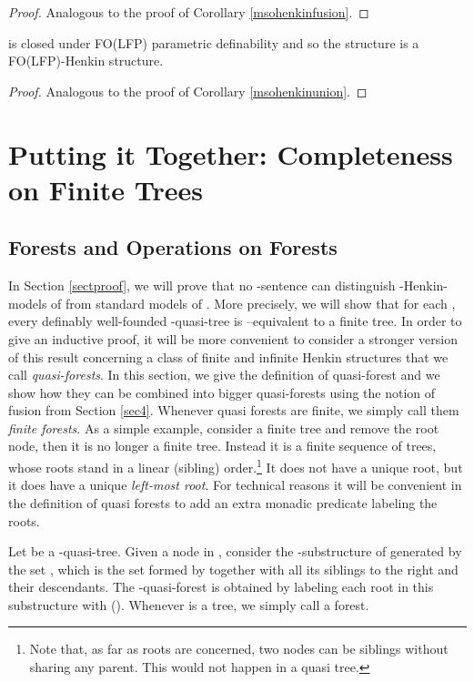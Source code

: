 \documentclass{LMCS}
\newcommand{\folfp}{\textsf{FO(LFP)}\xspace}
\begin{document}
\begin{proof}
Analogous to the proof of Corollary \ref{msohenkinfusion}.
\end{proof}

\begin{cor}
 is closed
under \folfp parametric definability and so the structure  is a \folfp-Henkin
structure.
\label{folfphenkinunion}
\end{cor}
\begin{proof}
Analogous to the proof of Corollary \ref{msohenkinunion}.
\end{proof}



\section{Putting it Together: Completeness on Finite Trees}
\label{sec5}

\subsection{Forests and Operations on Forests}

In Section \ref{sectproof}, we will prove that no -sentence can
distinguish -Henkin-models of 
from standard models of . More precisely,
we will show that for each , every definably
well-founded -quasi-tree is --equivalent to a finite
tree. In order to give an inductive proof, it will be more convenient
to consider a stronger version of this result concerning a class of finite and infinite Henkin
structures that we call \textit{quasi-forests}. In this section, we give the definition of quasi-forest and we show how they can be combined into bigger quasi-forests using the notion of fusion from Section \ref{sec4}. Whenever quasi forests are finite, we simply call them \emph{finite
forests}. As a simple example, consider a finite tree and remove the root node, then it is no longer a finite tree. Instead it is a finite sequence of trees, whose roots stand in a linear (sibling)
order.\footnote{Note that, as far as roots are concerned, two
nodes can be siblings without sharing any parent. This would not
happen in a quasi tree.} It does not have a unique root, but it does have a
unique \emph{left-most root}. For technical reasons it will be convenient in the definition of quasi forests to add an extra monadic predicate  labeling the roots.

\begin{defi}
Let  be a
-quasi-tree. Given a node  in , consider the -substructure of
 generated by the set , which is the set formed by 
together with all its siblings to the right and their descendants.
The -quasi-forest  is obtained by labeling each
root in this substructure with  (). Whenever  is a tree, we simply call  a
forest.
\end{defi}
\end{document}
